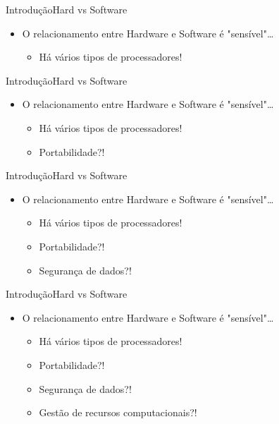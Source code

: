 \documentclass{beamer}
\begin{document}
\begin{frame}{Introdução}{Hard vs Software}
  \begin{itemize}
    \item O relacionamento entre Hardware e Software é "sensível"\dots
      \begin{itemize}
        \item Há vários tipos de processadores!
      \end{itemize}
  \end{itemize}
\end{frame}


\begin{frame}{Introdução}{Hard vs Software}
  \begin{itemize}
    \item O relacionamento entre Hardware e Software é "sensível"\dots
      \begin{itemize}
        \item Há vários tipos de processadores!
        \item Portabilidade?!
      \end{itemize}
  \end{itemize}
\end{frame}

\begin{frame}{Introdução}{Hard vs Software}
  \begin{itemize}
    \item O relacionamento entre Hardware e Software é "sensível"\dots
      \begin{itemize}
        \item Há vários tipos de processadores!
        \item Portabilidade?!
        \item Segurança de dados?!
      \end{itemize}
  \end{itemize}
\end{frame}

\begin{frame}{Introdução}{Hard vs Software}
  \begin{itemize}
    \item O relacionamento entre Hardware e Software é "sensível"\dots
      \begin{itemize}
        \item Há vários tipos de processadores!
        \item Portabilidade?!
        \item Segurança de dados?!
        \item Gestão de recursos computacionais?!
      \end{itemize}
  \end{itemize}
\end{frame}
\end{document}

